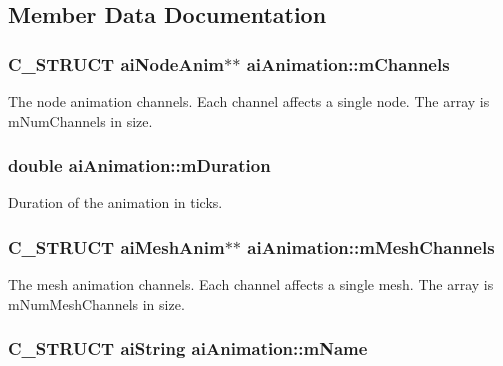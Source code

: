 \subsection{Member Data Documentation}
\hypertarget{structai_animation_a89244bb68b725ffbb85137174c28e757}{
\subsubsection[{m\-Channels}]{\setlength{\rightskip}{0pt plus 5cm}C\-\_\-\-S\-T\-R\-U\-C\-T {\bf ai\-Node\-Anim}$\ast$$\ast$ ai\-Animation\-::m\-Channels}}\label{structai_animation_a89244bb68b725ffbb85137174c28e757}
The node animation channels. Each channel affects a single node. The array is m\-Num\-Channels in size. \hypertarget{structai_animation_ae2bbc49320b4b75c05e23e0ab704ece7}{
\subsubsection[{m\-Duration}]{\setlength{\rightskip}{0pt plus 5cm}double ai\-Animation\-::m\-Duration}}\label{structai_animation_ae2bbc49320b4b75c05e23e0ab704ece7}
Duration of the animation in ticks. \hypertarget{structai_animation_af05138121dbde8b31aa031505b454c85}{
\subsubsection[{m\-Mesh\-Channels}]{\setlength{\rightskip}{0pt plus 5cm}C\-\_\-\-S\-T\-R\-U\-C\-T {\bf ai\-Mesh\-Anim}$\ast$$\ast$ ai\-Animation\-::m\-Mesh\-Channels}}\label{structai_animation_af05138121dbde8b31aa031505b454c85}
The mesh animation channels. Each channel affects a single mesh. The array is m\-Num\-Mesh\-Channels in size. \hypertarget{structai_animation_a1be7d78d88694173a7ceef658fea77f1}{
\subsubsection[{m\-Name}]{\setlength{\rightskip}{0pt plus 5cm}C\-\_\-\-S\-T\-R\-U\-C\-T {\bf ai\-String} ai\-Animation\-::m\-Name}}\label{structai_animation_a1be7d78d88694173a7ceef658fea77f1}
